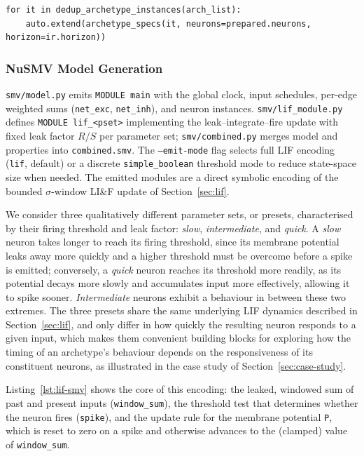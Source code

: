 \documentclass[
]{ceurart}
\begin{document}
\begin{lstlisting}[style=pythoncode,caption={Property emission order in \texttt{properties.py}.},label=lst:properties-order]
for it in dedup_archetype_instances(arch_list):
    auto.extend(archetype_specs(it, neurons=prepared.neurons, horizon=ir.horizon))
\end{lstlisting}

\subsubsection{NuSMV Model Generation}

\texttt{smv/model.py} emits \texttt{MODULE main} with the global clock,
input schedules, per-edge weighted sums (\texttt{net\_exc}, \texttt{net\_inh}),
and neuron instances. \texttt{smv/lif\_module.py} defines
\texttt{MODULE lif\_<pset>} implementing the leak--integrate--fire update
with fixed leak factor $R/S$ per parameter set; \texttt{smv/combined.py}
merges model and properties into \texttt{combined.smv}. The
\texttt{--emit-mode} flag selects full LIF encoding (\texttt{lif}, default)
or a discrete \texttt{simple\_boolean} threshold mode to reduce state-space
size when needed. The emitted modules are a direct symbolic encoding of the
bounded $\sigma$-window LI\&F update of Section~\ref{sec:lif}.

We consider three qualitatively different parameter sets, or presets,
characterised by their firing threshold and leak factor: \emph{slow},
\emph{intermediate}, and \emph{quick}. A \emph{slow} neuron takes longer to
reach its firing threshold, since its membrane potential leaks away more
quickly and a higher threshold must be overcome before a spike is emitted;
conversely, a \emph{quick} neuron reaches its threshold more readily, as its
potential decays more slowly and accumulates input more effectively,
allowing it to spike sooner. \emph{Intermediate} neurons exhibit a
behaviour in between these two extremes. The three presets share the same
underlying LIF dynamics described in Section~\ref{sec:lif}, and only differ
in how quickly the resulting neuron responds to a given input, which makes
them convenient building blocks for exploring how the timing of an
archetype's behaviour depends on the responsiveness of its constituent
neurons, as illustrated in the case study of Section~\ref{sec:case-study}.

Listing~\ref{lst:lif-smv} shows the core of this encoding: the leaked,
windowed sum of past and present inputs (\texttt{window\_sum}), the
threshold test that determines whether the neuron fires
(\texttt{spike}), and the update rule for the membrane potential
\texttt{P}, which is reset to zero on a spike and otherwise advances to
the (clamped) value of \texttt{window\_sum}.
\end{document}
